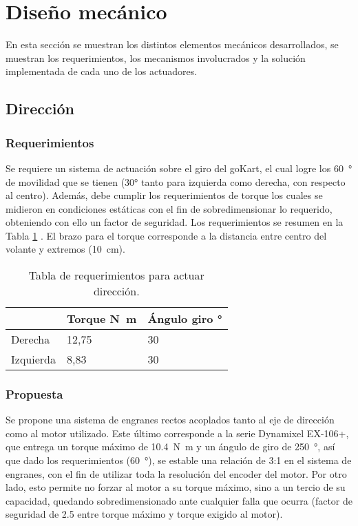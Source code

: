\section{Diseño mecánico}

En esta sección se muestran los distintos elementos mecánicos desarrollados, se muestran los requerimientos, los mecanismos involucrados y la solución implementada de cada uno de los actuadores.

\subsection{Dirección}

\subsubsection{Requerimientos}

Se requiere un sistema de actuación sobre el giro del goKart, el cual logre los \SI{60}{\degree} de movilidad que se tienen (30° tanto para izquierda como derecha, con respecto al centro). Además, debe cumplir los requerimientos de torque los cuales se midieron en condiciones estáticas con el fin de sobredimensionar lo requerido, obteniendo con ello un factor de seguridad. Los requerimientos se resumen en la Tabla \ref{sw} . El brazo para el torque corresponde a la distancia entre centro del volante y extremos (\SI{10}{\centi\meter}). 

\begin{table}[H]
\centering
\begin{tabular}{l|l|l|}
\cline{2-3}
                                & Torque \si{\newton\meter} & Ángulo giro \si{\degree} \\ \hline
\multicolumn{1}{|l|}{Derecha}   & 12,75                     & 30                       \\ \hline
\multicolumn{1}{|l|}{Izquierda} & 8,83                      & 30                       \\ \hline
\end{tabular}
\caption{Tabla de requerimientos para actuar dirección.}
\label{sw}
\end{table}

\subsubsection{Propuesta}

Se propone una sistema de engranes rectos acoplados tanto al eje de dirección como al motor utilizado. Este último corresponde a la serie Dynamixel EX-106+, que entrega un torque máximo de \SI{10.4}{\newton\meter} y un ángulo de giro de \SI{250}{\degree}, así que dado los requerimientos (\SI{60}{\degree}), se estable una relación de 3:1 en el sistema de engranes, con el fin de utilizar toda la resolución del encoder del motor. Por otro lado, esto permite no forzar al motor a su torque máximo, sino a un tercio de su capacidad, quedando sobredimensionado ante cualquier falla que ocurra (factor de seguridad de 2.5 entre torque máximo y torque exigido al motor).

